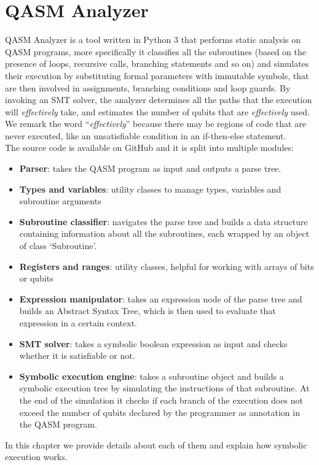 \documentclass[12pt,a4paper]{report}
\theoremstyle{definition}
\theoremstyle{definition}
\theoremstyle{definition}
\begin{document}
\chapter{QASM Analyzer}
QASM Analyzer is a tool written in Python 3 that performs static analysis on QASM programs, more specifically it classifies all the subroutines (based on the presence of loops, recursive calls, branching statements and so on) and simulates their execution by substituting formal parameters with immutable symbols, that are then involved in assignments, branching conditions and loop guards. By invoking an SMT solver, the analyzer determines all the paths that the execution will \textit{effectively} take, and estimates the number of qubits that are \textit{effectively} used. We remark the word ``\textit{effectively}'' because there may be regions of code that are never executed, like an unsatisfiable condition in an if-then-else statement.\\
The source code is available on GitHub \cite{lusvelt} and it is split into multiple modules:
\begin{itemize}
    \itemsep 0em
    \item \textbf{Parser}: takes the QASM program as input and outputs a parse tree.
    \item \textbf{Types and variables}: utility classes to manage types, variables and subroutine arguments
    \item \textbf{Subroutine classifier}: navigates the parse tree and builds a data structure containing information about all the subroutines, each wrapped by an object of class `Subroutine'.
    \item \textbf{Registers and ranges}: utility classes, helpful for working with arrays of bits or qubits
    \item \textbf{Expression manipulator}: takes an expression node of the parse tree and builds an Abstract Syntax Tree, which is then used to evaluate that expression in a certain context.
    \item \textbf{SMT solver}: takes a symbolic boolean expression as input and checks whether it is satisfiable or not.
    \item \textbf{Symbolic execution engine}: takes a subroutine object and builds a symbolic execution tree by simulating the instructions of that subroutine. At the end of the simulation it checks if each branch of the execution does not exceed the number of qubits declared by the programmer as annotation in the QASM program.
\end{itemize}
In this chapter we provide details about each of them and explain how symbolic execution works.
\end{document}
